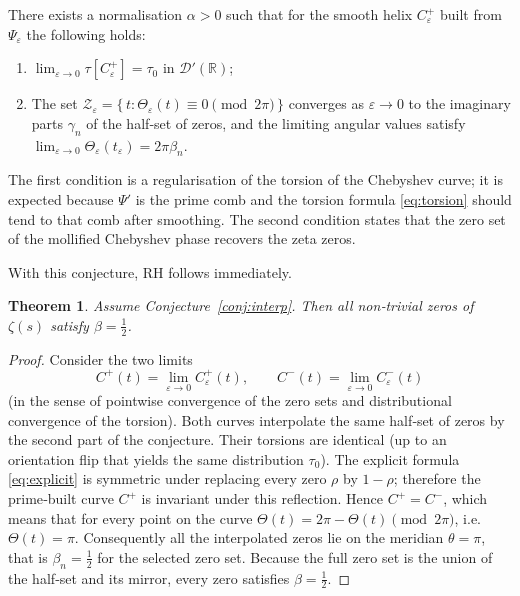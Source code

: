 \documentclass[12pt,a4paper]{article}
\newtheorem{theorem}{Theorem}[section]
\newcommand{\R}{\mathbb{R}}
\newcommand{\D}{\mathcal{D}'}
\begin{document}
\begin{conjecture}\label{conj:interp}
There exists a normalisation \(\alpha>0\) such that for the smooth helix
\(C_\varepsilon^+\) built from \(\Psi_\varepsilon\) the following holds:
\begin{enumerate}
\item \(\displaystyle\lim_{\varepsilon\to0} \tau[C_\varepsilon^+] = \tau_0\)
      in \(\D(\R)\);
\item The set \(\mathcal{Z}_\varepsilon = \{\,t : \Theta_\varepsilon(t)\equiv0
      \pmod{2\pi}\,\}\) converges as \(\varepsilon\to0\) to the imaginary parts
      \(\gamma_n\) of the half‑set of zeros, and the limiting angular values
      satisfy \(\lim_{\varepsilon\to0}\Theta_\varepsilon(t_\varepsilon)=2\pi\beta_n\).
\end{enumerate}
\end{conjecture}

The first condition is a regularisation of the torsion of the Chebyshev curve;
it is expected because \(\Psi'\) is the prime comb and the torsion formula
\eqref{eq:torsion} should tend to that comb after smoothing.  The second
condition states that the zero set of the mollified Chebyshev phase recovers
the zeta zeros.

With this conjecture, RH follows immediately.

\begin{theorem}\label{thm:RH}
Assume Conjecture~\ref{conj:interp}.  Then all non‑trivial zeros of \(\zeta(s)\)
satisfy \(\beta=\frac12\).
\end{theorem}

\begin{proof}
Consider the two limits
\[
C^+(t) = \lim_{\varepsilon\to0} C_\varepsilon^+(t),\qquad
C^-(t) = \lim_{\varepsilon\to0} C_\varepsilon^-(t)
\]
(in the sense of pointwise convergence of the zero sets and distributional
convergence of the torsion).  Both curves interpolate the same half‑set of zeros
by the second part of the conjecture.  Their torsions are identical (up to an
orientation flip that yields the same distribution \(\tau_0\)).  The explicit
formula \eqref{eq:explicit} is symmetric under replacing every zero \(\rho\) by
\(1-\rho\); therefore the prime‑built curve \(C^+\) is invariant under this
reflection.  Hence \(C^+ = C^-\), which means that for every point on the curve
\(\Theta(t) = 2\pi - \Theta(t) \pmod{2\pi}\), i.e.\ \(\Theta(t)=\pi\).
Consequently all the interpolated zeros lie on the meridian \(\theta=\pi\),
that is \(\beta_n=\frac12\) for the selected zero set.  Because the full zero set
is the union of the half‑set and its mirror, every zero satisfies \(\beta=\frac12\).
\end{proof}
\end{document}

